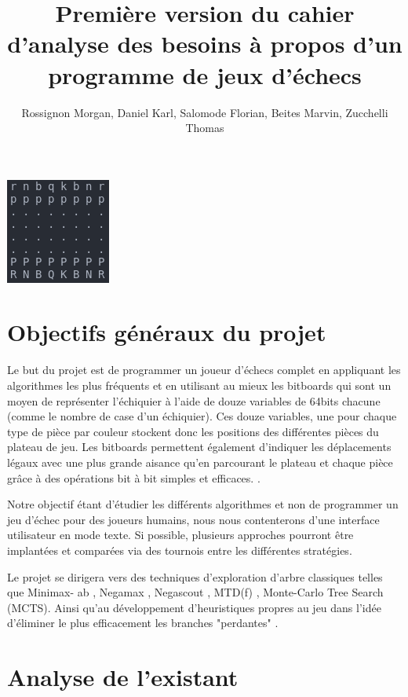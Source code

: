 \documentclass{article}
\title{Première version du cahier d’analyse des besoins à propos d'un programme de jeux d'échecs}
\author{Rossignon Morgan, Daniel Karl, Salomode Florian, Beites Marvin, Zucchelli Thomas}
\begin{document}
\maketitle
\centerline{\includegraphics[scale = 1]{img/echecs_title.png}}

\tableofcontents
\newpage

\section{Objectifs généraux du projet}
Le but du projet est de programmer un joueur d'échecs complet en appliquant les algorithmes les plus fréquents et en utilisant au mieux les bitboards qui sont un moyen de représenter l'échiquier à l'aide de douze variables de 64bits chacune (comme le nombre de case d'un échiquier). \newline
Ces  douze variables, une pour chaque type de pièce par couleur stockent donc les positions des différentes pièces du plateau de jeu.  Les bitboards permettent également d'indiquer les déplacements légaux avec une plus grande aisance qu'en parcourant le plateau et chaque pièce grâce à des opérations bit à bit simples et efficaces. \cite{Bitboards}. 

Notre objectif étant d'étudier les différents algorithmes et non de programmer un jeu d'échec pour des joueurs humains, nous nous contenterons d'une interface utilisateur en mode texte. Si possible, plusieurs approches pourront être implantées et comparées via des tournois entre les différentes stratégies.

Le projet se dirigera vers des techniques d'exploration d'arbre classiques telles que Minimax-
ab \cite{Minmax-ab}, Negamax \cite{Negamax}, Negascout \cite{Negascout}, MTD(f) \cite{MTD(f)}, Monte-Carlo Tree Search (MCTS)\cite{MCTS}. Ainsi qu'au développement d'heuristiques propres au jeu dans l'idée d'éliminer le plus efficacement les branches "perdantes" \cite{Heuristiques}.


\section{Analyse de l'existant}
\end{document}

